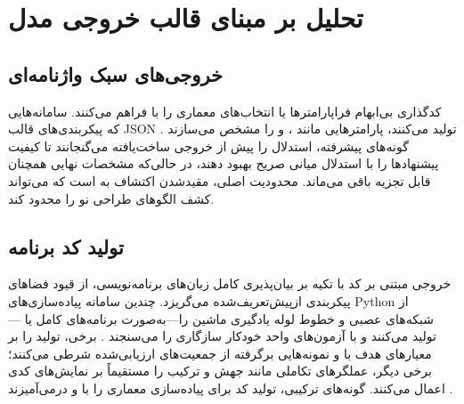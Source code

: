 
\section{تحلیل بر مبنای قالب خروجی مدل}

\subsection{خروجی‌های سبک واژنامه‌ای}

 کدگذاری بی‌ابهام فراپارامترها یا انتخاب‌های معماری را با  فراهم می‌کنند. سامانه‌هایی که پیکربندی‌های قالب JSON تولید می‌کنند، پارامترهایی مانند ،  و  را مشخص می‌سازند \cite{zhang2023usingLLMforHPO, liu2025agenthpo}. گونه‌های پیشرفته، استدلال  را پیش از خروجی ساخت‌یافته می‌گنجانند تا کیفیت پیشنهادها را با استدلال میانی صریح بهبود دهند، در حالی‌که مشخصات نهایی همچنان قابل تجزیه باقی می‌ماند. محدودیت اصلی، مقیدشدن اکتشاف به  است که می‌تواند کشف الگوهای طراحی نو را محدود کند.

\subsection{تولید کد برنامه}

خروجی مبتنی بر کد با تکیه بر بیان‌پذیری کامل زبان‌های برنامه‌نویسی، از قیود فضاهای پیکربندی ازپیش‌تعریف‌شده می‌گریزد. چندین سامانه پیاده‌سازی‌های Python از شبکه‌های عصبی و خطوط لوله یادگیری ماشین را—به‌صورت برنامه‌های کامل یا —تولید می‌کنند و با آزمون‌های واحد خودکار سازگاری را می‌سنجند \cite{xu2024largeTextToML, LLMatic2024, chen2023Evoprompting}. برخی، تولید را بر معیارهای هدف با  و نمونه‌هایی برگرفته از جمعیت‌های ارزیابی‌شده شرطی می‌کنند؛ برخی دیگر، عملگرهای تکاملی مانند جهش و ترکیب را مستقیماً بر نمایش‌های کدی اعمال می‌کنند. گونه‌های ترکیبی، تولید کد برای پیاده‌سازی معماری را با  و  درمی‌آمیزند \cite{zhang2023AutomlGPTAutomaticMachineLearning, trirat2025automlagent}.

